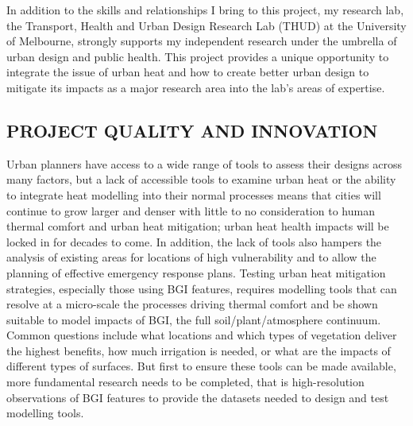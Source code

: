 In addition to the skills and relationships I bring to this project, my research lab, the Transport, Health and Urban Design Research Lab (THUD) at the University of Melbourne, strongly supports my independent research under the umbrella of urban design and public health. This project provides a unique opportunity to integrate the issue of urban heat and how to create better urban design to mitigate its impacts as a major research area into the lab's areas of expertise.

\subsection*{\TitleFont PROJECT QUALITY AND INNOVATION}



Urban planners have access to a wide range of tools to assess their designs across many factors, but a lack of accessible tools to examine urban heat or the ability to integrate heat modelling into their normal processes means that cities will continue to grow larger and denser with little to no consideration to human thermal comfort and urban heat mitigation; urban heat health impacts will be locked in for decades to come. In addition, the lack of tools also hampers the analysis of existing areas for locations of high vulnerability and to allow the planning of effective emergency response plans. Testing urban heat mitigation strategies, especially those using BGI features, requires modelling tools that can resolve at a micro-scale the processes driving thermal comfort and be shown suitable to model impacts of BGI, the full soil/plant/atmosphere continuum. Common questions include what locations and which types of vegetation deliver the highest benefits, how much irrigation is needed, or what are the impacts of different types of surfaces. But first to ensure these tools can be made available, more fundamental research needs to be completed, that is high-resolution observations of BGI features to provide the datasets needed to design and test modelling tools. 


